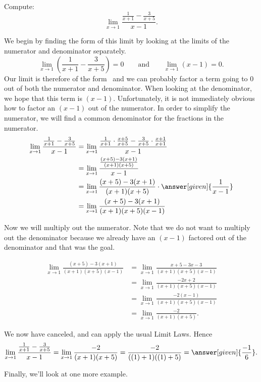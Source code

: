 \documentclass{ximera}
\begin{document}
\begin{example}
  Compute:
  \[
  \lim_{x\to 1} \frac{\frac{1}{x+1}-\frac{3}{x+5}}{x-1}.
  \]
\begin{explanation}
  We begin by finding the form of this limit by looking at the limits
  of the numerator and denominator separately.
  \[
  \lim_{x\to 1}\left(\frac{1}{x+1}-\frac{3}{x+5}\right)=0\qquad\text{and}\qquad\lim_{x\to 1}\left(x-1\right)=0.
  \]
Our limit is therefore of the form \zeroOverZero\ and we can
probably factor a term going to $0$ out of both the numerator and
denominator.  When looking at the denominator, we hope that this
term is $(x-1)$.  Unfortunately, it is not immediately obvious how to
factor an $(x-1)$ out of the numerator.  In order to simplify the
numerator, we will find a common denominator for the fractions in the
numerator.
\begin{align*}
\lim_{x\to 1} \frac{\frac{1}{x+1}-\frac{3}{x+5}}{x-1}  &= \lim_{x\to 1} \frac{\frac{1}{x+1} \cdot \frac{x+5}{x+5}-\frac{3}{x+5} \cdot \frac{x+1}{x+1}}{x-1}\\
&= \lim_{x\to 1} \frac{\frac{(x+5)-3(x+1)}{(x+1)(x+5)}}{x-1}\\
&= \lim_{x\to 1}\frac{(x+5)-3(x+1)}{(x+1)(x+5)} \cdot\answer[given]{\frac{1}{x-1}}\\
&= \lim_{x\to 1}\frac{(x+5)-3(x+1)}{(x+1)(x+5)(x-1)}
\end{align*}

Now we will multiply out the numerator.  Note that we do not want to
multiply out the denominator because we already have an $(x-1)$
factored out of the denominator and that was the goal.

\begin{align*}
\lim_{x\to 1}\frac{(x+5)-3(x+1)}{(x+1)(x+5)(x-1)} &= \lim_{x\to 1}\frac{x+5-3x-3}{(x+1)(x+5)(x-1)} \\
&= \lim_{x\to 1}\frac{-2x+2}{(x+1)(x+5)(x-1)}\\
&= \lim_{x\to 1}\frac{-2(x-1)}{(x+1)(x+5)(x-1)}\\
&= \lim_{x\to 1}\frac{-2}{(x+1)(x+5)}.
\end{align*}
  
We now have canceled, and can apply the usual Limit Laws.  Hence
\[
\lim_{x\to 1} \frac{\frac{1}{x+1}-\frac{3}{x+5}}{x-1}=\lim_{x\to
  1}\frac{-2}{(x+1)(x+5)} = \frac{-2}{((1)+1)((1)+5)} =
\answer[given]{\frac{-1}{6}}.
\]
\end{explanation}
\end{example}

Finally, we'll look at one more example.
\end{document}
